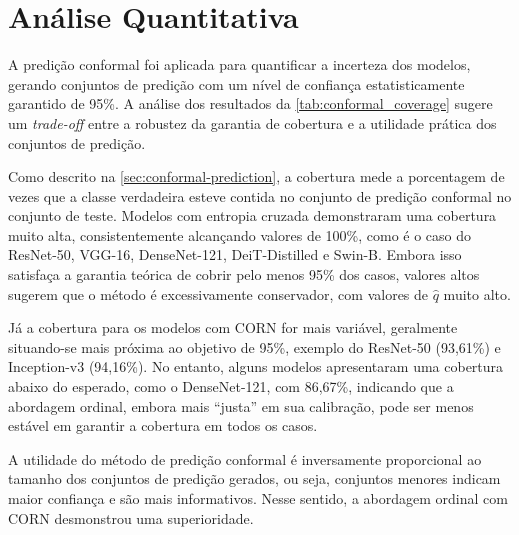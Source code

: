 
\section{Análise Quantitativa}

A predição conformal foi aplicada para quantificar a incerteza dos modelos, gerando conjuntos de predição com um nível de confiança estatisticamente garantido de 95\%. A análise dos resultados da \autoref{tab:conformal_coverage} sugere um \textit{trade-off} entre a robustez da garantia de cobertura e a utilidade prática dos conjuntos de predição.

Como descrito na \autoref{sec:conformal-prediction}, a cobertura mede a porcentagem de vezes que a classe verdadeira esteve contida no conjunto de predição conformal no conjunto de teste. Modelos com entropia cruzada demonstraram uma cobertura muito alta, consistentemente alcançando valores de 100\%, como é o caso do ResNet-50, VGG-16, DenseNet-121, DeiT-Distilled e Swin-B. Embora isso satisfaça a garantia teórica de cobrir pelo menos 95\% dos casos, valores altos sugerem que o método é excessivamente conservador, com valores de $\hat{q}$ muito alto.

Já a cobertura para os modelos com CORN for mais variável, geralmente situando-se mais próxima ao objetivo de 95\%, exemplo do ResNet-50 (93,61\%) e Inception-v3 (94,16\%). No entanto, alguns modelos apresentaram uma cobertura abaixo do esperado, como o DenseNet-121, com 86,67\%, indicando que a abordagem ordinal, embora mais ``justa'' em sua calibração, pode ser menos estável em garantir a cobertura em todos os casos.

A utilidade do método de predição conformal é inversamente proporcional ao tamanho dos conjuntos de predição gerados, ou seja, conjuntos menores indicam maior confiança e são mais informativos. Nesse sentido, a abordagem ordinal com CORN desmonstrou uma superioridade.


